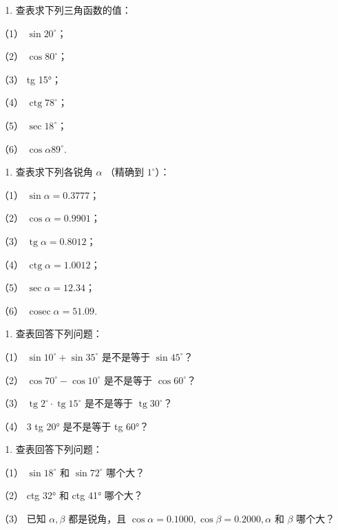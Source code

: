 \begin{enumerate}
\item
  查表求下列三角函数的值：
\end{enumerate}

（1） \(\sin 20^{\circ}\)；

（2） \(\cos 80^{\circ}\)；

（3） tg 15°；

（4） \(\operatorname{ctg} 78^{\circ}\)；

（5） \(\sec 18^{\circ}\)；

（6） \(\cos \alpha 89^{\circ}\).

\begin{enumerate}[start=2]
\item
  查表求下列各锐角 \(\alpha\) （精确到 \(1^{\circ}\)）：
\end{enumerate}

（1） \(\sin \alpha = 0.3777\)；

（2） \(\cos \alpha = 0.9901\)；

（3） \(\operatorname{tg} \alpha = 0.8012\)；

（4） \(\operatorname{ctg} \alpha = 1.0012\)；

（5） \(\sec \alpha = 12.34\)；

（6） \(\operatorname{cosec} \alpha = 51.09\).

\begin{enumerate}[start=3]
\item
  查表回答下列问题：
\end{enumerate}

（1） \(\sin 10^{\circ} + \sin 35^{\circ}\) 是不是等于
\(\sin 45^{\circ}\)？

（2） \(\cos 70^{\circ} - \cos 10^{\circ}\) 是不是等于
\(\cos 60^{\circ}\)？

（3） \(\operatorname{tg} 2^{\circ} \cdot \operatorname{tg} 15^{\circ}\)
是不是等于 \(\operatorname{tg} 30^{\circ}\)？

（4） 3 tg 20° 是不是等于 tg 60°？

\begin{enumerate}[start=4]
\item
  查表回答下列问题：
\end{enumerate}

（1） \(\sin 18^{\circ}\) 和 \(\sin 72^{\circ}\) 哪个大？

（2） ctg 32° 和 ctg 41° 哪个大？

（3） 已知 \(\alpha, \beta\) 都是锐角，且
\(\cos \alpha = 0.1000, \cos \beta = 0.2000, \alpha\) 和 \(\beta\)
哪个大？

